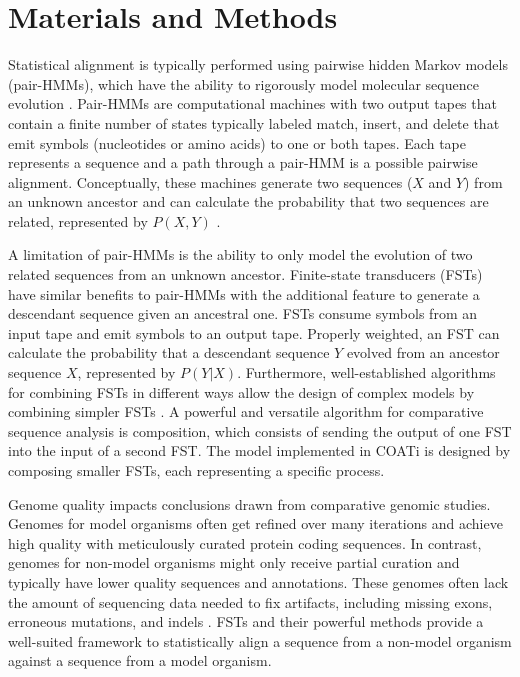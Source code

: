 \section*{Materials and Methods}  %

Statistical alignment is typically performed using pairwise hidden Markov models (pair-HMMs), which have the ability to rigorously model molecular sequence evolution .
Pair-HMMs are computational machines with two output tapes that contain a finite number of states typically labeled match, insert, and delete that emit symbols (nucleotides or amino acids) to one or both tapes.
Each tape represents a sequence and a path through a pair-HMM is a possible pairwise alignment.
Conceptually, these machines generate two sequences ($X$ and $Y$) from an unknown ancestor and can calculate the probability that two sequences are related, represented by $P(X, Y)$ .

A limitation of pair-HMMs is the ability to only model the evolution of two related sequences from an unknown ancestor.
Finite-state transducers (FSTs) have similar benefits to pair-HMMs with the additional feature to generate a descendant sequence given an ancestral one.
FSTs consume symbols from an input tape and emit symbols to an output tape.
Properly weighted, an FST can calculate the probability that a descendant sequence $Y$ evolved from an ancestor sequence $X$, represented by $P(Y | X)$.
Furthermore, well-established algorithms for combining FSTs in different ways allow the design of complex models by combining simpler FSTs .
A powerful and versatile algorithm for comparative sequence analysis is composition, which consists of sending the output of one FST into the input of a second FST.
The model implemented in COATi is designed by composing smaller FSTs, each representing a specific process.

Genome quality impacts conclusions drawn from comparative genomic studies. 
Genomes for model organisms often get refined over many iterations and achieve high quality with meticulously curated protein coding sequences.
In contrast, genomes for non-model organisms might only receive partial curation and typically have lower quality sequences and annotations.
These genomes often lack the amount of sequencing data needed to fix artifacts, including missing exons, erroneous mutations, and indels .
FSTs and their powerful methods provide a well-suited framework to statistically align a sequence from a non-model organism against a sequence from a model organism.


